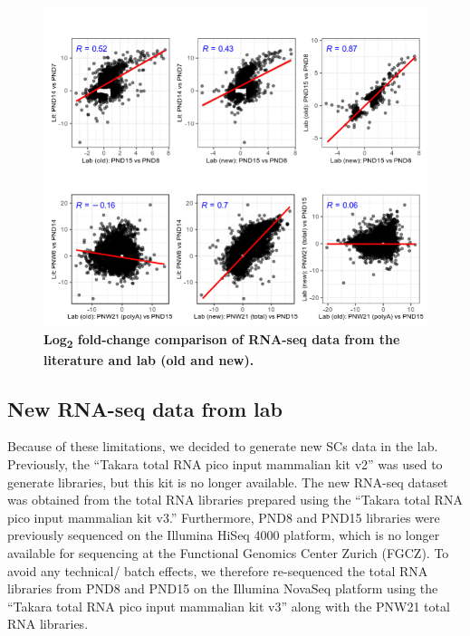 \documentclass[12pt,twoside]{reedthesis}
\begin{document}
\begin{figure}[H]

{\centering \includegraphics{thesis_files/figure-latex/dn1-1} 

}

\caption[Log\textsubscript{2} fold-change comparison of RNA-seq data
from the literature and lab (old and new)]{\textbf{Log\textsubscript{2} fold-change comparison of RNA-seq data from the literature and lab (old and new).}}\label{fig:dn1}
\end{figure}
\hypertarget{new-rna-seq-data-from-lab}{%
\subsection{New RNA-seq data from lab}\label{new-rna-seq-data-from-lab}}

Because of these limitations, we decided to generate new SCs data in the
lab. Previously, the ``Takara total RNA pico input mammalian kit v2'' was
used to generate libraries, but this kit is no longer available. The new
RNA-seq dataset was obtained from the total RNA libraries prepared using
the ``Takara total RNA pico input mammalian kit v3.'' Furthermore, PND8
and PND15 libraries were previously sequenced on the Illumina HiSeq 4000
platform, which is no longer available for sequencing at the Functional
Genomics Center Zurich (FGCZ). To avoid any technical/ batch effects, we
therefore re-sequenced the total RNA libraries from PND8 and PND15 on
the Illumina NovaSeq platform using the ``Takara total RNA pico input
mammalian kit v3'' along with the PNW21 total RNA libraries.
\end{document}
